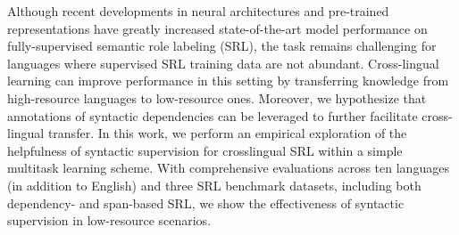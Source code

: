 Although recent developments in neural architectures and pre-trained representations have greatly increased state-of-the-art model performance on fully-supervised semantic role labeling (SRL), the task remains challenging for languages where supervised SRL training data are not abundant. Cross-lingual learning can improve performance in this setting by transferring knowledge from high-resource languages to low-resource ones. Moreover, we hypothesize that annotations of syntactic dependencies can be leveraged to further facilitate cross-lingual transfer. In this work, we perform an empirical exploration of the helpfulness of syntactic supervision for crosslingual SRL within a simple multitask learning scheme. With comprehensive evaluations across ten languages (in addition to English) and three SRL benchmark datasets, including both dependency- and span-based SRL, we show the effectiveness of syntactic supervision in low-resource scenarios.
